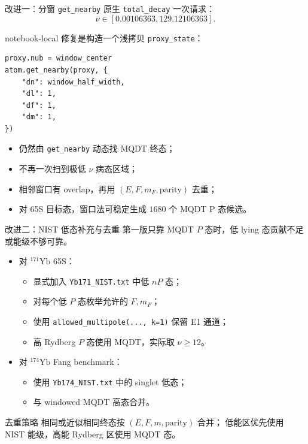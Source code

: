 \documentclass[aspectratio=169,11pt]{ctexbeamer}
\begin{document}
\begin{frame}[fragile]{改进一：分窗 \texttt{get\_nearby}}
  \small
  原生 \texttt{total\_decay} 一次请求：
  \[
    \nu\in[0.00106363,129.12106363].
  \]

  notebook-local 修复是构造一个浅拷贝 \texttt{proxy\_state}：
  \begin{verbatim}
proxy.nub = window_center
atom.get_nearby(proxy, {
    "dn": window_half_width,
    "dl": 1,
    "df": 1,
    "dm": 1,
})
  \end{verbatim}

  \begin{itemize}
    \item 仍然由 \texttt{get\_nearby} 动态找 MQDT 终态；
    \item 不再一次扫到极低 \(\nu\) 病态区域；
    \item 相邻窗口有 overlap，再用 \((E,F,m_F,\mathrm{parity})\) 去重；
    \item 对 65S 目标态，窗口法可稳定生成 \(1680\) 个 MQDT P 态候选。
  \end{itemize}
\end{frame}

\begin{frame}{改进二：NIST 低态补充与去重}
  第一版只靠 MQDT \(P\) 态时，低 lying 态贡献不足或能级不够可靠。

  \begin{itemize}
    \item 对 \({}^{171}\mathrm{Yb}\) 65S：
      \begin{itemize}
        \item 显式加入 \texttt{Yb171\_NIST.txt} 中低 \(nP\) 态；
        \item 对每个低 \(P\) 态枚举允许的 \(F,m_F\)；
        \item 使用 \texttt{allowed\_multipole(..., k=1)} 保留 E1 通道；
        \item 高 Rydberg \(P\) 态使用 MQDT，实际取 \(\nu\ge 12\)。
      \end{itemize}
    \item 对 \({}^{174}\mathrm{Yb}\) Fang benchmark：
      \begin{itemize}
        \item 使用 \texttt{Yb174\_NIST.txt} 中的 singlet 低态；
        \item 与 windowed MQDT 高态合并。
      \end{itemize}
  \end{itemize}

  \begin{block}{去重策略}
    相同或近似相同终态按 \((E,F,m,\mathrm{parity})\) 合并；
    低能区优先使用 NIST 能级，高能 Rydberg 区使用 MQDT 态。
  \end{block}
\end{frame}
\end{document}
